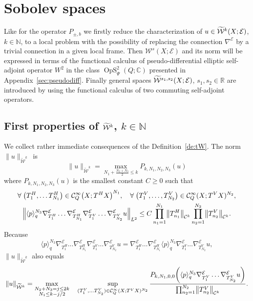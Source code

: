 \documentclass[AHL,Unicode,longabstracts]{cedram}
\newcommand{\C}{\mathbb{C}}
\newcommand{\R}{\mathbb{R}}
\newcommand{\N}{\mathbb{N}}
\newcommand{\clW}{\mathcal{W}}
\newcommand{\clC}{\mathcal{C}}
\newcommand{\clE}{\mathcal{E}}
\DeclareMathOperator{\OpS}{OpS}
\let\oldtilde\tilde
\renewcommand*{\tilde}[1]{\mathchoice{\widetilde{#1}}{\widetilde{#1}}{\oldtilde{#1}}{\oldtilde{#1}}}
\let\oldforall\forall
\renewcommand*{\forall}{\mathrel{\oldforall}}
\let\originalleft\left
\let\originalright\right
\renewcommand{\left}{\mathopen{}\mathclose\bgroup\originalleft}
\renewcommand{\right}{\aftergroup\egroup\originalright}
\begin{document}
\section{Sobolev spaces}\label{sec:spacesWs}

Like for the operator $P_{\pm,b}$ we firstly reduce the characterization of $u\in\tilde{\clW}^{k}(X;\clE)$, $k\in\N$, to a local problem with the possibility of replacing the connection $\nabla^{\clE}$ by a trivial connection in a given local frame. Then $\clW^{s}(X;\clE)$ and its norm will be expressed in terms of the functional calculus of pseudo-differential elliptic self-adjoint operator $W^{2}$ in the class $\OpS^{2}_{\Psi}(Q;\C)$ presented in Appendix~\ref{sec:pseudodiff}. Finally general spaces $\tilde{\clW}^{s_{1},s_{2}}(X;\clE)$, $s_{1},s_{2}\in \R$ are introduced by using the functional calculus of two commuting self-adjoint operators.

\subsection{First properties of \texorpdfstring{$\tilde{\clW}^k$}{W\^k}, \texorpdfstring{$k\in\N$}{k in N}}\label{sec:firstWk}

We collect rather immediate consequences of the Definition~\ref{de:tW}. The norm $\|u\|_{\widetilde{\clW}^{k}}$~is
\begin{equation}\label{eq:normeNkW}
\|u\|_{\widetilde{\clW}^{k}}=\max_{N_{1}+\frac{N_{2}+N_{3}}{2}\leq k} P_{k,N_{1},N_{2},N_{3}}(u)
\end{equation}
where $P_{k,N_{1},N_{2},N_{3}}(u)$ is the smallest constant $C\geq 0$ such that
\begin{multline*}
\forall \left(T_{1}^{H},\dots T_{N_{1}}^{H}\right)\in \clC^{\infty}_{Q}\left(X;T^{H}X\right)^{N_{1}},\quad \forall \left(T_{1}^{V},\dots, T_{N_{2}}^{V}\right)\in \clC^{\infty}_{Q}(X;T^{V}X)^{N_{2}},\\
\left\|\langle p\rangle_{q}^{N_{3}}\nabla_{T_{1}^{H}}^{\clE}\dots \nabla_{T_{N_{1}}^{H}}^{\clE}\nabla_{T_{1}^{V}}^{\clE}\dots \nabla_{T_{N_{2}}^{V}}^{\clE}u\right\|_{L^{2}}\leq C\prod_{n_{1}=1}^{N_{1}}\left\|T_{n_{1}}^{H}\right\|_{\clC^{k}}\prod_{n_{2}=1}^{N_{2}}\left\|T_{n_{2}}^{V}\right\|_{\clC^{k}}.
\end{multline*}
Because
\[
\langle p\rangle_{q}^{N_{3}}\nabla_{T_{1}^{H}}^{\clE}\dots \nabla_{T_{N_{1}}^{H}}^{\clE}\nabla_{T_{1}^{V}}^{\clE}\dots \nabla_{T_{N_{2}}^{V}}^{\clE}u =
\nabla_{T_{1}^{H}}^{\clE}\dots \nabla_{T_{N_{1}}^{H}}^{\clE}
\langle p\rangle_{q}^{N_{3}}\nabla_{T_{1}^{V}}^{\clE}\dots \nabla_{T_{N_{2}}^{V}}^{\clE}u,
\]
$\|u\|_{\widetilde{\clW}^{k}}$ also equals
\begin{equation}\label{eq:redN1}
\|u\|_{\widetilde{\clW}^{k}}=\max_{\substack{N_{2}+N_{3}=j\leq 2k \\ N_{1}\leq k-j/2 }}
\quad \sup_{(T_{1}^{V},\dots T_{N_{2}}^{V})\in \clC^{\infty}_{Q}(X;T^{V}X)^{N_{2}}}\frac{P_{k,N_{1},0,0}\left(\langle p\rangle_{q}^{N_{3}}\nabla_{T_{1}^{V}}^{\clE}\dots \nabla_{T_{N_{2}}^{V}}^{\clE}u\right)}{\prod_{n_{2}=1}^{N_{2}}\left\|T_{n_{2}}^{V}\right\|_{\clC^{k}}}.
\end{equation}
\end{document}
